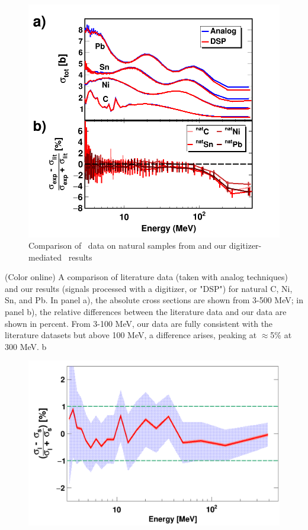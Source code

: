 \begin{figure}
    \includegraphics[scale=0.5]{figures/literatureBenchmarking.png}
    \caption{Comparison of \tot\ data on natural samples from \cite{Finlay1993,Abfalterer2001} and
our digitizer-mediated \tot\ results}
    \label{LiteratureBenchmarking}
\end{figure}

(Color online) A comparison of literature data (taken with analog
    techniques) and our results (signals processed with a digitizer, or "DSP")
    for natural C, Ni, Sn, and Pb. In panel a), the absolute cross sections are shown from
    3-500 MeV; in panel b), the relative differences between the literature data and
    our data are shown in percent. From 3-100 MeV, our data are fully consistent with the
    literature datasets but above 100 MeV, a difference arises, peaking at
    $\approx$5\% at 300 MeV.
b

\begin{figure}
    \includegraphics[scale=0.30]{figures/relativeDiff_longCarbonShortCarbon.png}
    \caption{}
    \label{CarbonBenchmarking}
\end{figure}

